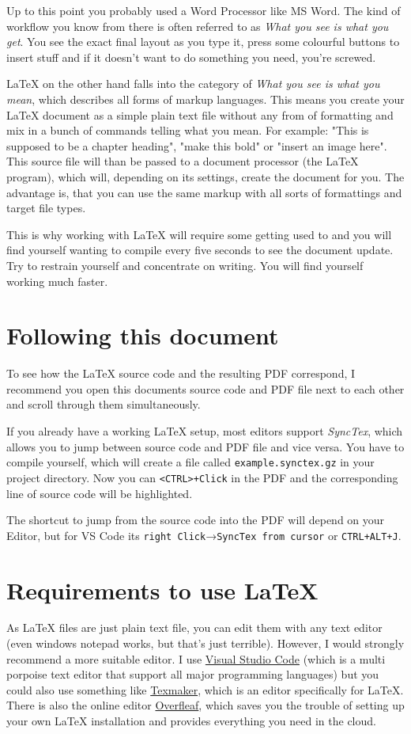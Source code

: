 \documentclass[	%
		fontsize=11pt,  %
		a4paper,	    %
		english,		%
		sans,			%
		f1,				%
	]{HsH-report}		%
\begin{document}
	\medskip
	Up to this point you probably used a Word Processor like MS Word. The kind of workflow you know from there is often referred to as \emph{What you
	see is what you get}. You see the exact final layout as you type it, press some colourful buttons to insert stuff and if it doesn't want to do
	something you need, you're screwed.

	LaTeX on the other hand falls into the category of \emph{What you see is what you mean}, which describes all forms of markup languages. This means
	you create your LaTeX document as a simple plain text file without any from of formatting and mix in a bunch of commands telling what you mean.
	For example: "This is supposed to be a chapter heading", "make this bold" or "insert an image here". This source file will than be passed to a
	document processor (the LaTeX program), which will, depending on its settings, create the document for you. The advantage is, that you can use the
	same markup with all sorts of formattings and target file types.

	This is why working with LaTeX will require some getting used to and you will find yourself wanting to compile every five seconds to see the
	document update. Try to restrain yourself and concentrate on writing. You will find yourself working much faster.

	\section{Following this document}
		To see how the LaTeX source code and the resulting PDF correspond, I recommend you open this documents source code and PDF file next to each
		other and scroll through them simultaneously.

		If you already have a working LaTeX setup, most editors support \emph{SyncTex}, which allows you to jump between source code and PDF file and
		vice versa. You have to compile yourself, which will create a file called \lstinline{example.synctex.gz} in your project directory. Now you
		can \lstinline{<CTRL>+Click} in the PDF and the corresponding line of source code will be highlighted.

		The shortcut to jump from the source code into the PDF will depend on your Editor, but for VS Code its
		\lstinline{right Click}→\lstinline{SyncTex from cursor} or \lstinline{CTRL+ALT+J}.

	\section{Requirements to use LaTeX}
		As LaTeX files are just plain text file, you can edit them with any text editor (even windows notepad works, but that's just terrible).
		However, I would strongly recommend a more suitable editor. I use \href{https://code.visualstudio.com/}{Visual Studio Code} (which is a multi
		porpoise text editor that support all major programming languages) but you could also use something like
		\href{https://www.xm1math.net/texmaker/}{Texmaker}, which is an editor specifically for LaTeX. There is also the online editor
		\href{https://www.overleaf.com/}{Overfleaf}, which saves you the trouble of setting up your own LaTeX installation and provides everything you
		need in the cloud.
\end{document}
